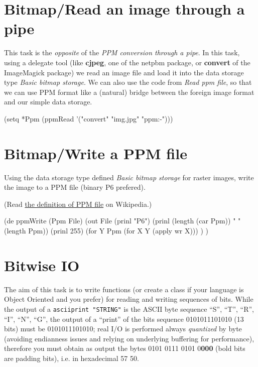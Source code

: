 \pagebreak{}
\section*{Bitmap/Read an image through a pipe}


This task is the \emph{opposite} of the \emph{PPM conversion through a
  pipe}. In this task, using a delegate tool (like \textbf{cjpeg}, one
of the netpbm package, or \textbf{convert} of the ImageMagick package)
we read an image file and load it into the data storage type
\emph{Basic bitmap storage}. We can also use the code from \emph{Read
  ppm file}, so that we can use PPM format like a (natural) bridge
between the foreign image format and our simple data storage.


\begin{wideverbatim}

(setq *Ppm (ppmRead '("convert" "img.jpg" "ppm:-")))

\end{wideverbatim}

\pagebreak{}
\section*{Bitmap/Write a PPM file}

Using the data storage type defined \emph{Basic bitmap storage} for
raster images, write the image to a PPM file (binary P6 prefered).

(Read \href{http://en.wikipedia.org/wiki/Netpbm\_format}{the
  definition of PPM file} on Wikipedia.)


\begin{wideverbatim}

(de ppmWrite (Ppm File)
   (out File
      (prinl "P6")
      (prinl (length (car Ppm)) " " (length Ppm))
      (prinl 255)
      (for Y Ppm (for X Y (apply wr X))) ) )

\end{wideverbatim}

\pagebreak{}
\section*{Bitwise IO}

The aim of this task is to write functions (or create a class if your
language is Object Oriented and you prefer) for reading and writing
sequences of bits. While the output of a \texttt{asciiprint "STRING"} is
the ASCII byte sequence ``S'', ``T'', ``R'', ``I'', ``N'', ``G'', the
output of a ``print'' of the bits sequence 0101011101010 (13 bits) must
be 0101011101010; real I/O is performed always \emph{quantized} by byte
(avoiding endianness issues and relying on underlying buffering for
performance), therefore you must obtain as output the bytes 0101 0111
0101 0\textbf{000} (bold bits are padding bits), i.e. in hexadecimal 57
50.

